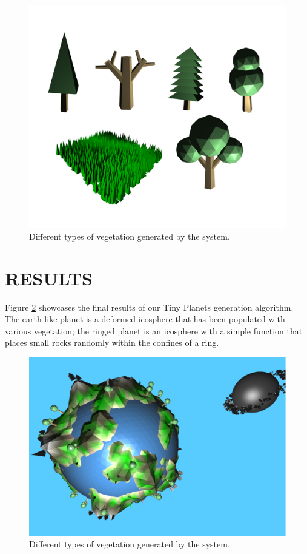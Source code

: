 \documentclass[a4paper,twoside]{article}
\begin{document}
\begin{figure}
\centering
\includegraphics[scale=0.3]{./images/trees/alltrees.png}
\caption{Different types of vegetation generated by the system.}
\label{fig_all_trees}
\end{figure}

\section{\uppercase{Results}}
\label{sec:res}
\noindent Figure \ref{fig_results} showcases the final results of our Tiny Planets generation algorithm. The earth-like planet is a deformed icosphere that has been populated with various vegetation; the ringed planet is an icosphere with a simple function that places small rocks randomly within the confines of a ring.

\begin{figure}
\centering
\includegraphics[scale=0.3]{./images/planets/results.png}
\caption{Different types of vegetation generated by the system.}
\label{fig_results}
\end{figure}


{\small
}
\vfill
\end{document}
